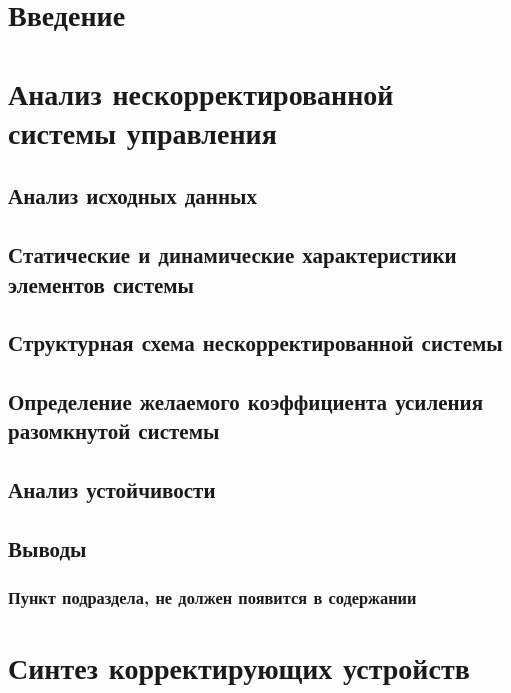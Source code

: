 \section*{Введение}
\label{sec:intro}
 \pagebreak

\section{Анализ нескорректированной системы управления} \pagebreak
\label{sec:analysys_equations}

\subsection{Анализ исходных данных} \pagebreak 
\label{sec:analysys_data}

\subsection{Статические и динамические характеристики элементов системы} \pagebreak 
\label{sec:stat_and_dyn}

\subsection{Структурная схема нескорректированной системы} \pagebreak 
\label{sec:str_schema}

\subsection{Определение желаемого коэффициента усиления разомкнутой системы} \pagebreak 
\label{sec:determ_factor}

\subsection{Анализ устойчивости} \pagebreak 
\label{sec:analysys_rob}

\subsection{Выводы} \pagebreak 
\label{sec:conclusion}

\subsubsection{Пункт подраздела, не должен появится в содержании} \pagebreak
\section{Синтез корректирующих устройств} \pagebreak
